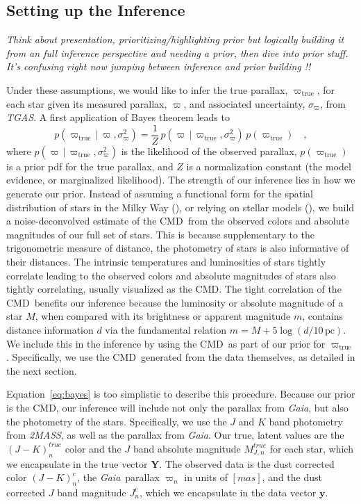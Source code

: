 \documentclass[modern]{aastex61}
\newcommand{\acronym}[1]{{\small{#1}}}
\newcommand{\project}[1]{\textsl{#1}}
\newcommand{\tgas}{\project{\acronym{TGAS}}}
\newcommand{\tmass}{\project{\acronym{2MASS}}}
\newcommand{\gaia}{\project{Gaia}}
\newcommand{\cmd}{\acronym{CMD}}
\newcommand{\given}{\,|\,}
\newcommand{\true}{\mathrm{true}}
\begin{document}
\subsection{Setting up the Inference}
 \emph{Think about presentation, prioritizing/highlighting prior but logically building it from an full inference perspective and needing a prior, then dive into prior stuff. It's confusing right now jumping between inference and prior building !!}

Under these assumptions, we would like to infer the true parallax, $\varpi_{\true}$, for each star given its measured parallax, $\varpi$, and associated uncertainty, $\sigma_{\varpi}$, from \tgas.
A first application of Bayes theorem leads to
\begin{equation}
p(\varpi_{\true} \given \varpi, \sigma^2_{\varpi}) = \frac{1}{Z}\,p(\varpi \given \varpi_{\true}, \sigma^2_{\varpi}) \, p(\varpi_{\true}) \quad ,
\label{eq:bayes}
\end{equation}
where $p(\varpi \given \varpi_{\true}, \sigma^2_{\varpi})$ is the likelihood of the observed parallax, $p(\varpi_{\true})$ is a prior pdf for the true
parallax, and $Z$ is a normalization constant (the model evidence, or marginalized likelihood).
The strength of our inference lies in how we generate our prior.
Instead of assuming a functional form for the spatial distribution of stars in the Milky Way (\citealt{astraatmadja16b}), or relying on stellar models (\citealt{gaia16}), we build a noise-deconvolved estimate of the \cmd\ from the observed colors and absolute magnitudes of our full set of stars.
This is because supplementary to the trigonometric measure of distance, the photometry of stars is also informative of their distances.
The intrinsic temperatures and luminosities of stars tightly correlate leading to the observed colors and absolute magnitudes of stars also tightly correlating, usually visualized as the \cmd.
The tight correlation of the \cmd\ benefits our inference because the luminosity or absolute magnitude of a star $M$, when compared with its brightness or apparent magnitude $m$, contains distance information $d$ via the fundamental relation $m=M+5\log(d/10\, \mathrm{pc})$.
We include this in the inference by using the \cmd\ as part of our prior for $\varpi_{\true}$.
Specifically, we use the \cmd\ generated from the data themselves, as detailed in the next section.

Equation~\ref{eq:bayes} is too simplistic to describe this procedure.
Because our prior is the \cmd, our inference will include not only the parallax from \gaia, but also the photometry of the stars. Specifically, we use the $J$ and $K$ band photometry from \tmass, as well as the parallax from \gaia. Our true, latent values are the $(J-K)^{true}_n$ color and the $J$ band absolute magnitude $M^{true}_{J,n}$ for each star, which we encapsulate in the true vector $\mathbf{Y}$. The observed data is the dust corrected color $(J-K)^c_n$, the \gaia\ parallax $\varpi_n$ in units of $[mas]$, and the dust corrected $J$ band magnitude $J^c_n$, which we encapsulate in the data vector $\mathbf{y}$.
\end{document}
